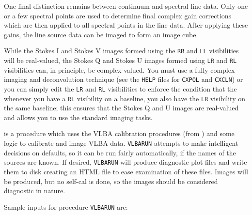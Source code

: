 One final distinction remains between continuum and spectral-line
data.  Only one or a few spectral points are used to determine final
complex gain corrections which are then applied to all spectral points
in the line data.  After applying these gains, the line source data
can be imaged to form an image cube.

While the Stokes I and Stokes V images formed using the {\tt RR} and
{\tt LL} visibilities will be real-valued, the Stokes Q and Stokes U
images formed using {\tt LR} and {\tt RL} visibilities can, in
principle, be complex-valued.  You must use a fully complex imaging
and deconvolution technique (see the {\tt HELP} files for {\tt CXPOL}
and {\tt CXCLN}) or you can simply edit the {\tt LR} and {\tt RL}
visibilities to enforce the condition that the whenever you have a
{\tt RL} visibility on a baseline, you also have the {\tt LR}
visibility on the same baseline; this ensures that the Stokes Q and U
images are real-valued and allows you to use the standard imaging
tasks.
\xeit


{\tt {}} is a procedure which uses the VLBA calibration
procedures (from {\tt {}}) and some logic to calibrate
and image VLBA data.  {\tt VLBARUN} attempts to make intelligent
decisions on defaults, so it can be run fairly automatically, if the
names of the sources are known.  If desired, {\tt VLBARUN} will
produce diagnostic plot files and write them to disk creating an HTML
file to ease examination of these files.  Images will be produced, but
no self-cal is done, so the images should be considered diagnostic in
nature.

Sample inputs for procedure {\tt VLBARUN} are:

